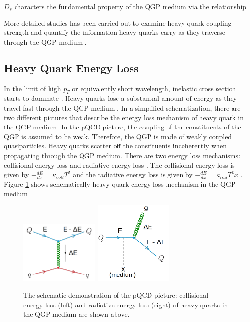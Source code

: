 $D_s$ characters the fundamental property of the QGP medium via the relationship 

More detailed studies has been carried out to examine heavy quark coupling strength and quantify the information heavy quarks carry as they traverse through the QGP medium \cite{HQJamie}.


\subsection{Heavy Quark Energy Loss}

In the limit of high $p_T$ or equivalently short wavelength, inelastic cross section starts to dominate \cite{}. Heavy quarks lose a substantial amount of energy as they travel fast through the QGP medium \cite{HQELossFirst}. In a simplified schematization, there are two different pictures that describe the energy loss mechanism of heavy quark in the QGP medium. In the pQCD picture, the coupling of the constituents of the QGP is assumed to be weak. Therefore, the QGP is made of weakly coupled quasiparticles. Heavy quarks scatter off the constituents incoherently when propagating through the QGP medium. There are two energy loss mechanisms: collisional energy loss and radiative energy loss \cite{}. The collisional energy loss is given by $-\frac{dE}{dx} = \kappa_{coll}T^2$ and the radiative energy loss is given by  $-\frac{dE}{dx} = \kappa_{rad}T^3x$ \cite{HQCollELoss,HQRadELoss}. Figure \ref{HQELosspQCD} shows schematically heavy quark energy loss mechanism in the QGP medium



 \begin{figure}[hbtp]
\begin{center}
\includegraphics[width=0.35\textwidth]{Figures/Chapter1/Collisional.png}
\includegraphics[width=0.35\textwidth]{Figures/Chapter1/Radiative.png}
\caption{The schematic demonstration of the pQCD picture: collisional energy loss (left) and radiative energy loss (right) of heavy quarks in the QGP medium are shown above.}
\label{HQELosspQCD}
\end{center}
\end{figure}   

